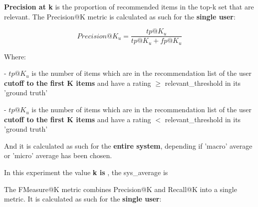 \documentclass[12pt, a4paper]{article}
\begin{document}



\hfill\break
\textbf{Precision at k} is the proportion of recommended items in the top-k set that are relevant.
 The Precision@K metric is calculated as such for the \textbf{single user}:

    \[
    Precision@K_u = \frac{tp@K_u}{tp@K_u + fp@K_u}
    \]

    Where:

    - $tp@K_u$ is the number of items which are in the recommendation list  of the user
      \textbf{cutoff to the first K items} and have a rating $\geq$ relevant\_threshold in its 'ground truth'

    - $tp@K_u$ is the number of items which are in the recommendation list  of the user
      \textbf{cutoff to the first K items} and have a rating $<$ relevant\_threshold in its 'ground truth'

    And it is calculated as such for the \textbf{entire system}, depending if 'macro' average or 'micro' average has been
    chosen.


In this experiment the value \textbf{k is },
the sys\_average is \textbf{}



\hfill\break\hfill\break
 The FMeasure@K metric combines Precision@K and Recall@K into a single metric.
 It is calculated as such for the
    \textbf{single user}:
\end{document}
